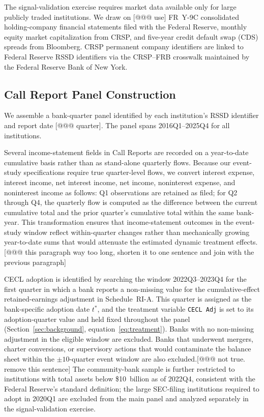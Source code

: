 The signal-validation exercise requires market data available only for large
publicly traded institutions. We draw on [@@@ use] FR~Y-9C consolidated holding-company
financial statements filed with the Federal Reserve, monthly equity market
capitalization from CRSP, and five-year credit default swap (CDS) spreads
from Bloomberg. CRSP permanent company identifiers are linked to Federal Reserve
RSSD identifiers via the CRSP--FRB crosswalk maintained by the Federal Reserve
Bank of New York.

\subsection{Call Report Panel Construction}
\label{sec:data:panel}

We assemble a  bank-quarter panel identified by each institution's RSSD
identifier and report date [@@@ quarter]. The panel spans 2016Q1--2025Q4
for all institutions.

Several income-statement fields in Call Reports are recorded on a
year-to-date cumulative basis rather than as stand-alone quarterly flows.
Because our event-study specifications require true quarter-level flows, we
convert interest expense, interest income, net interest income, net income,
noninterest expense, and noninterest income as follows: Q1 observations are
retained as filed; for Q2 through Q4, the quarterly flow is computed as the
difference between the current cumulative total and the prior quarter's
cumulative total within the same bank-year. This transformation ensures that
income-statement outcomes in the event-study window reflect within-quarter
changes rather than mechanically growing year-to-date sums that would attenuate
the estimated dynamic treatment effects. [@@@ this paragraph way too long, shorten it to one sentence and join with the previous paragraph]

CECL adoption is identified by searching the window 2022Q3--2023Q4 for the
first quarter in which a bank reports a non-missing value for the
cumulative-effect retained-earnings adjustment in Schedule~RI-A. This quarter is
assigned as the bank-specific adoption date $t^{*}$, and the treatment variable
\texttt{CECL Adj} is set to its adoption-quarter value and held fixed
throughout the panel (Section~\ref{sec:background}, equation~\eqref{eq:treatment}).
Banks with no non-missing adjustment in the eligible window are excluded. Banks
that underwent mergers, charter conversions, or supervisory actions that would
contaminate the balance sheet within the $\pm 10$-quarter event window are also
excluded.[@@@ not true. remove this sentence] The community-bank sample is further restricted to institutions with
total assets below \$10~billion as of 2022Q4, consistent with the Federal
Reserve's standard definition; the large SEC-filing institutions required to
adopt in 2020Q1 are excluded from the main panel and analyzed separately in the
signal-validation exercise.

